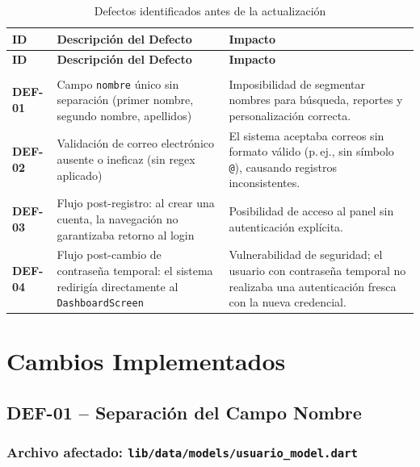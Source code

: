 \documentclass[12pt,a4paper]{article}
\begin{document}
\begin{longtable}{>{\bfseries}p{3.5cm} p{4.5cm} p{5.5cm}}
\caption{Defectos identificados antes de la actualización} \label{tab:defectos} \\
\toprule
\textbf{ID} & \textbf{Descripción del Defecto} & \textbf{Impacto} \\
\midrule
\endfirsthead
\toprule
\textbf{ID} & \textbf{Descripción del Defecto} & \textbf{Impacto} \\
\midrule
\endhead
\midrule
\multicolumn{3}{r}{\small Continúa en la siguiente página\ldots} \\
\endfoot
\bottomrule
\endlastfoot
DEF-01 & Campo \texttt{nombre} único sin separación
         (primer nombre, segundo nombre, apellidos) &
         Imposibilidad de segmentar nombres para búsqueda, reportes
         y personalización correcta. \\[0.5em]
DEF-02 & Validación de correo electrónico ausente o ineficaz
         (sin regex aplicado) &
         El sistema aceptaba correos sin formato válido (p.\,ej.,
         sin símbolo \texttt{@}), causando registros inconsistentes. \\[0.5em]
DEF-03 & Flujo post-registro: al crear una cuenta, la navegación
         no garantizaba retorno al login &
         Posibilidad de acceso al panel sin autenticación explícita. \\[0.5em]
DEF-04 & Flujo post-cambio de contraseña temporal: el sistema
         redirigía directamente al \texttt{DashboardScreen} &
         Vulnerabilidad de seguridad; el usuario con contraseña
         temporal no realizaba una autenticación fresca con la
         nueva credencial. \\
\end{longtable}

\section{Cambios Implementados}

\subsection{DEF-01 -- Separación del Campo Nombre}

\subsubsection{Archivo afectado: \texttt{lib/data/models/usuario\_model.dart}}
\end{document}
